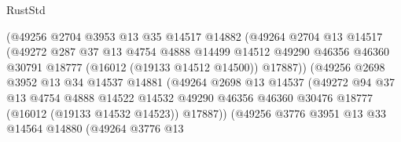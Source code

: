 \begin{lexlean}{RustStd}
\begin{coremodule}
                              (@49256
                                @2704
                                @3953
                                @13
                                @35
                                @14517
                                @14882
                                (@49264
                                  @2704
                                  @13
                                  @14517
                                  (@49272
                                    @287
                                    @37
                                    @13
                                    @4754
                                    @4888
                                    @14499
                                    @14512
                                    @49290
                                    @46356
                                    @46360
                                    @30791
                                    @18777
                                    (@16012 (@19133 @14512 @14500))
                                    @17887))
                                (@49256
                                  @2698
                                  @3952
                                  @13
                                  @34
                                  @14537
                                  @14881
                                  (@49264
                                    @2698
                                    @13
                                    @14537
                                    (@49272
                                      @94
                                      @37
                                      @13
                                      @4754
                                      @4888
                                      @14522
                                      @14532
                                      @49290
                                      @46356
                                      @46360
                                      @30476
                                      @18777
                                      (@16012 (@19133 @14532 @14523))
                                      @17887))
                                  (@49256
                                    @3776
                                    @3951
                                    @13
                                    @33
                                    @14564
                                    @14880
                                    (@49264
                                      @3776
                                      @13

\end{coremodule}
\end{lexlean}
